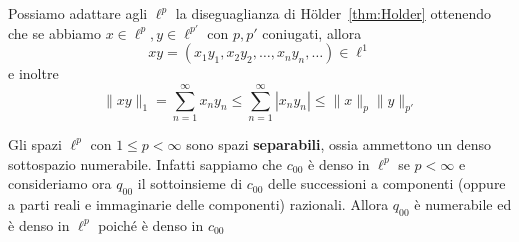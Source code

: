 Possiamo adattare agli \(\ell^{p}\) la diseguaglianza di Hölder~\ref{thm:Holder}
ottenendo che se abbiamo \(x \in \ell^{p}, y \in \ell^{p'}\) con \(p, p'\)
coniugati, allora
\[
  xy = {(x_{1}y_{1}, x_{2}y_{2}, \dots, x_{n}y_{n}, \dots)} \in \ell^{1} 
\]
e inoltre
\[
  \|xy\|_1 = \sum_{n=1}^{\infty} x_{n}y_{n} \le \sum_{n=1}^{\infty} |x_{n}y_{n}| \le
  \|x\|_p \|y\|_{p'} 
\]

Gli spazi \(\ell^{p}\) con \(1 \le p < \infty\) sono spazi \textbf{separabili},
ossia ammettono un denso sottospazio numerabile. Infatti sappiamo che \(c_{00}
\) è denso in \(\ell^{p}\) se \(p < \infty\) e consideriamo ora \(q_{00} \) il
sottoinsieme di \(c_{00}\) delle successioni a componenti (oppure a parti reali
e immaginarie delle componenti) razionali. Allora \(q_{00} \) è numerabile ed è
denso in \(\ell^{p}\) poiché è denso in \(c_{00}\) 

